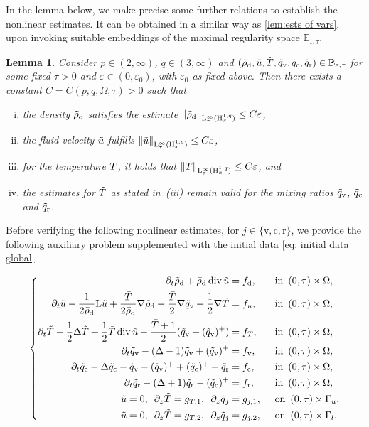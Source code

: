 \documentclass[10pt]{amsart}
\theoremstyle{plain}
\newtheorem{lem}[lem]{Lemma}
\theoremstyle{definition}
\theoremstyle{thm}
\numberwithin{equation}{section}
\newcommand{\rL}{\mathrm{L}}
\newcommand{\rH}{\mathrm{H}}
\newcommand{\E}{\mathbb{E}}
\DeclareMathOperator{\mdiv}{div}
\newcommand{\del}{\partial}
\newcommand{\dz}{\del_z}
\newcommand{\eps}{\varepsilon}
\newcommand{\Gal}{\Gamma_l}
\newcommand{\Gau}{\Gamma_u}
\newcommand{\ton}{\enspace \text{on} \enspace}
\newcommand{\tin}{\enspace \text{in} \enspace}
\newcommand{\rd}{\mathrm{d}}
\newcommand{\rr}{\mathrm{r}}
\newcommand{\rv}{\mathrm{v}}
\newcommand{\rc}{\mathrm{c}}
\newcommand{\trho}{\Tilde{\rho}}
\newcommand{\tu}{\Tilde{u}}
\newcommand{\tT}{\Tilde{T}}
\newcommand{\tq}{\Tilde{q}}
\begin{document}
In the lemma below, we make precise some further relations to establish the nonlinear estimates.
It can be obtained in a similar way as \autoref{lem:ests of vars}, upon invoking suitable embeddings of the maximal regularity space $\E_{1,\tau}$.

\begin{lem}\label{lem:further ests global wp}
Consider $p \in (2,\infty)$, $q \in (3,\infty)$ and $(\trho_{\rd},\tu,\tT,\tq_\rv,\tq_\rc,\tq_\rr) \in \mathbb{B}_{\eps, \tau}$ for some fixed $\tau > 0$ and $\eps \in (0,\eps_0)$, with $\eps_0$ as fixed above.
Then there exists a constant $C = C(p,q,\Omega,\tau) > 0$ such that
\begin{enumerate}[(i)]
    \item the density $\trho_\rd$ satisfies the estimate $\| \trho_\rd \|_{\rL_\tau^\infty(\rH_x^{1,q})} \le C \eps$,
    \item the fluid velocity $\tu$ fulfills $\| \tu \|_{\rL_\tau^\infty(\rH_x^{1,q})} \le C\eps$,
    \item for the temperature $\tT$, it holds that $\| \tT \|_{\rL_\tau^\infty(\rH_x^{1,q})} \le C\eps$, and
    \item the estimates for $\tT$ as stated in~(iii) remain valid for the mixing ratios $\tq_\rv$, $\tq_\rc$ and $\tq_\rr$.
\end{enumerate}
\end{lem}

Before verifying the following nonlinear estimates, for $j \in \{\rv,\rc,\rr\}$, we provide the following auxiliary problem supplemented with the initial data \eqref{eq: initial data global}. 

\begin{equation}\label{eq:Lagrangian coords global proof}
	\left\{	
    \begin{aligned}
        \del_t\trho_\rd+ \bar{\rho}_\rd \mdiv\tu
        &= f_\rd, &&\tin (0,\tau) \times \Omega,\\
		\del_t\tu -\frac{1}{ 2\bar{\rho}_\rd}\rL\tu + \frac{\bar{T}}{2 \bar{\rho}_\rd} \nabla \trho_\rd + \frac{\bar{T}}{2}\nabla \tq_\rv + \frac{1}{2}\nabla \tT 
        &= f_u, &&\tin (0,\tau) \times \Omega,\\
        \del_t\tT -\frac{1}{2}\Delta\tT + \frac{1}{2}\bar{T} \mdiv \tu - \frac{ \bar{T}+1 }{2}(\tq_\rv + (\tq_\rv)^+) 
        &=  f_T, &&\tin (0,\tau) \times \Omega,\\
        \del_t\tq_\rv -(\Delta -1)\tq_\rv + (\tq_\rv)^+
        &= f_\rv  , &&\tin (0,\tau) \times \Omega,\\
        \del_t\tq_\rc-\Delta\tq_\rc - \tq_\rv - (\tq_\rv)^+ + (\tq_\rc)^++\tq_\rr
        &=f_\rc, &&\tin (0,\tau) \times \Omega,\\
        \del_t\tq_\rr -(\Delta+1) \tq_\rr - (\tq_\rc)^+
        &= f_\rr, &&\tin (0,\tau) \times \Omega, \\
          \tu = 0, \enspace \dz \tT = g_{T,1}, \enspace \dz \tq_j
        &= g_{j,1}, &&\ton (0,\tau) \times \Gau,\\
        \tu = 0, \enspace \dz \tT = g_{T,2}, \enspace \dz \tq_j
        &= g_{j,2}, &&\ton (0,\tau) \times \Gal.
		\end{aligned}\right.
\end{equation}
\end{document}
